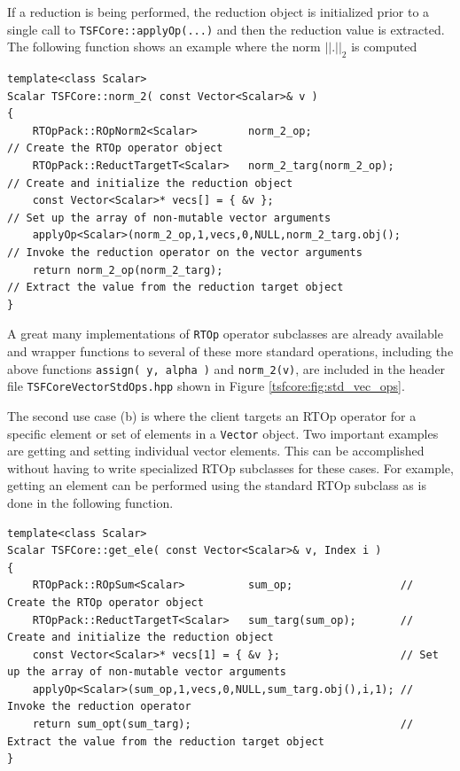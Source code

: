 If a reduction is being performed, the reduction object is initialized
prior to a single call to \texttt{TSFCore::applyOp(\-...)} and then the
reduction value is extracted.  The following function shows an example
where the norm $||.||_2$ is computed

{\tiny\begin{verbatim}
template<class Scalar>
Scalar TSFCore::norm_2( const Vector<Scalar>& v )
{
    RTOpPack::ROpNorm2<Scalar>        norm_2_op;                     // Create the RTOp operator object
    RTOpPack::ReductTargetT<Scalar>   norm_2_targ(norm_2_op);        // Create and initialize the reduction object
    const Vector<Scalar>* vecs[] = { &v };                           // Set up the array of non-mutable vector arguments
    applyOp<Scalar>(norm_2_op,1,vecs,0,NULL,norm_2_targ.obj();       // Invoke the reduction operator on the vector arguments
    return norm_2_op(norm_2_targ);                                   // Extract the value from the reduction target object
}
\end{verbatim}}

A great many implementations of \texttt{RTOp} operator subclasses are
already available and wrapper functions to several of these more
standard operations, including the above functions
\texttt{assign( y, alpha )} and \texttt{norm\_2(v)},
are included in the header file \texttt{TSFCore\-Vector\-Std\-Ops.hpp} shown in
Figure \ref{tsfcore:fig:std_vec_ops}.

The second use case (b) is where the client targets an RTOp operator
for a specific element or set of elements in a \texttt{Vector} object.
Two important examples are getting and setting individual vector
elements.  This can be accomplished without having to write specialized
RTOp subclasses for these cases.  For example, getting an element
can be performed using the standard RTOp subclass as is done
in the following function.

{\tiny\begin{verbatim}
template<class Scalar>
Scalar TSFCore::get_ele( const Vector<Scalar>& v, Index i )
{
    RTOpPack::ROpSum<Scalar>          sum_op;                 // Create the RTOp operator object
    RTOpPack::ReductTargetT<Scalar>   sum_targ(sum_op);       // Create and initialize the reduction object
    const Vector<Scalar>* vecs[1] = { &v };                   // Set up the array of non-mutable vector arguments
    applyOp<Scalar>(sum_op,1,vecs,0,NULL,sum_targ.obj(),i,1); // Invoke the reduction operator
    return sum_opt(sum_targ);                                 // Extract the value from the reduction target object
}
\end{verbatim}}

